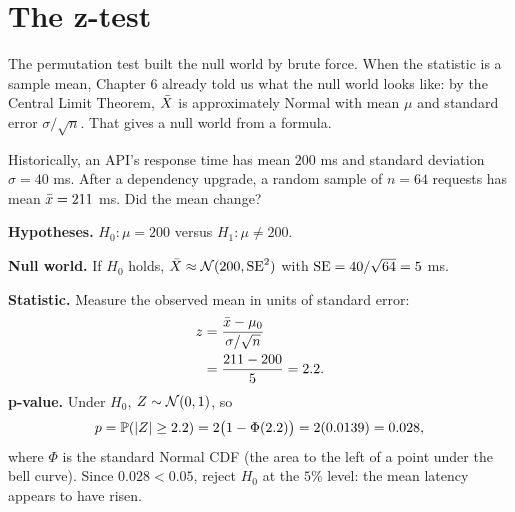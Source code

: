 \section{The z-test}
\label{sec:ht-z}

The permutation test built the null world by brute force. When the statistic is a
sample mean, Chapter 6 already told us what the null world looks like: by the
Central Limit Theorem, $\Xbar$ is approximately Normal with mean $\mu$ and standard
error $\sigma/\sqrt{n}$. That gives a null world from a formula.

\begin{example}
Historically, an API's response time has mean $200$ ms and standard deviation
$\sigma = 40$ ms. After a dependency upgrade, a random sample of $n=64$ requests has
mean $\xbar = 211$ ms. Did the mean change?

\textbf{Hypotheses.} $H_0\colon \mu = 200$ versus $H_1\colon \mu \ne 200$.

\textbf{Null world.} If $H_0$ holds, $\Xbar \approx \Normal(200, \SE^2)$ with
$\SE = 40/\sqrt{64} = 5$ ms.

\textbf{Statistic.} Measure the observed mean in units of standard error:
\begin{align*}
  z &= \frac{\xbar - \mu_0}{\sigma/\sqrt n} \\
  &= \frac{211-200}{5} = 2.2 .
\end{align*}
\textbf{p-value.} Under $H_0$, $Z\sim\Normal(0,1)$, so
\[
  p = \P(|Z| \ge 2.2) = 2\bigl(1-\Phi(2.2)\bigr) = 2(0.0139) = 0.028,
\]
where $\Phi$ is the standard Normal CDF (the area to the left of a point under the
bell curve). Since $0.028 < 0.05$, reject $H_0$ at the $5\%$ level: the
mean latency appears to have risen.
\end{example}

